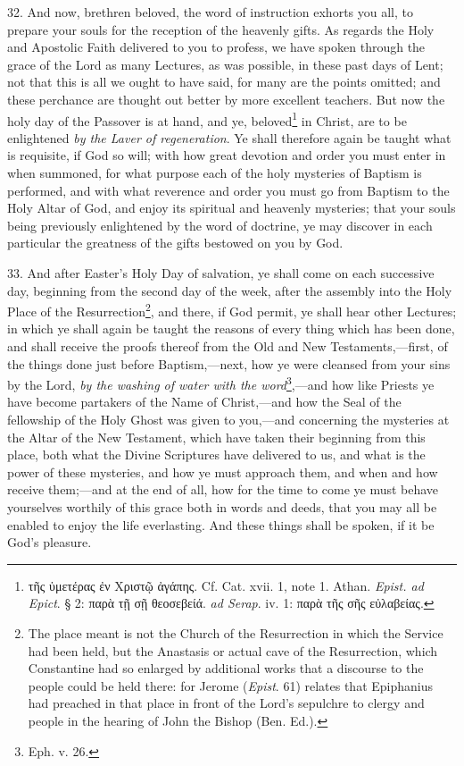 32. And now, brethren beloved, the word of instruction exhorts you all, to prepare your souls for the reception of the heavenly gifts. As regards the Holy and Apostolic Faith delivered to you to profess, we have spoken through the grace of the Lord as many Lectures, as was possible, in these past days of Lent; not that this is all we ought to have said, for many are the points omitted; and these perchance are thought out better by more excellent teachers. But now the holy day of the Passover is at hand, and ye, beloved\footnote{\textgreek{τῆς ὑμετέρας ἐν Χριστῷ ἀγάπης}. Cf. Cat. xvii. 1, note 1. Athan. \emph{Epist. ad Epict}. § 2: \textgreek{παρὰ τῇ σῇ θεοσεβείά}. \emph{ad Serap}. iv. 1: \textgreek{παρὰ τῆς σῆς εὐλαβείας}.} in Christ, are to be enlightened \emph{by the Laver of regeneration}. Ye shall therefore again be taught what is requisite, if God so will; with how great devotion and order you must enter in when summoned, for what purpose each of the holy mysteries of Baptism is performed, and with what reverence and order you must go from Baptism to the Holy Altar of God, and enjoy its spiritual and heavenly mysteries; that your souls being previously enlightened by the word of doctrine, ye may discover in each particular the greatness of the gifts bestowed on you by God.

33. And after Easter’s Holy Day of salvation, ye shall come on each successive day, beginning from the second day of the week, after the assembly into the Holy Place of the Resurrection\footnote{The place meant is not the Church of the Resurrection in which the Service had been held, but the Anastasis or actual cave of the Resurrection, which Constantine had so enlarged by additional works that a discourse to the people could be held there: for Jerome (\emph{Epist}. 61) relates that Epiphanius had preached in that place in front of the Lord’s sepulchre to clergy and people in the hearing of John the Bishop (Ben. Ed.).}, and there, if God permit, ye shall hear other Lectures; in which ye shall again be taught the reasons of every thing which has been done, and shall receive the proofs thereof from the Old and New Testaments,—first, of the things done just before Baptism,—next, how ye were cleansed from your sins by the Lord, \emph{by the washing of water with the word}\footnote{Eph. v. 26.},—and how like Priests ye have become partakers of the Name of Christ,—and how the Seal of the fellowship of the Holy Ghost was given to you,—and concerning the mysteries at the Altar of the New Testament, which have taken their beginning from this place, both what the Divine Scriptures have delivered to us, and what is the power of these mysteries, and how ye must approach them, and when and how receive them;—and at the end of all, how for the time to come ye must behave yourselves worthily of this grace both in words and deeds, that you may all be enabled to enjoy the life everlasting. And these things shall be spoken, if it be God’s pleasure.

